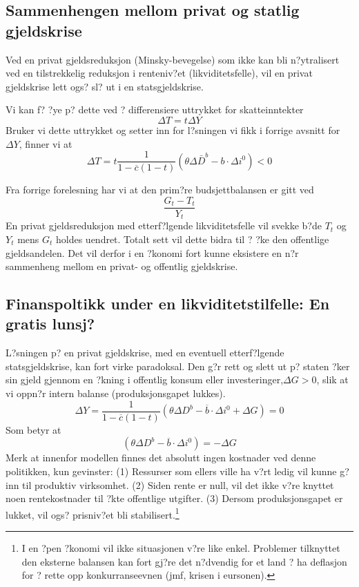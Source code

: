 \documentclass[a4paper,notitlepage]{article}
\begin{document}
\subsection{Sammenhengen mellom privat og statlig gjeldskrise}
Ved en privat gjeldsreduksjon (Minsky-bevegelse) som ikke kan bli n?ytralisert ved en tilstrekkelig reduksjon i renteniv?et (likviditetsfelle), vil en privat gjeldskrise lett ogs? sl? ut i en statsgjeldskrise.

Vi kan f? ?ye p? dette ved ? differensiere uttrykket for skatteinntekter \begin{equation*}
\Delta T=t \Delta Y
\end{equation*}
Bruker vi dette uttrykket og setter inn for l?sningen vi fikk i forrige avsnitt for $\Delta Y$, finner vi at
\begin{equation*}
\Delta T=t \frac{1}{1-\overline{c}(1-t)}(\theta \Delta\bar{D}^{b}-b\cdot \Delta i ^{0})<0
\end{equation*}

Fra forrige forelesning har vi at den prim?re budsjettbalansen er gitt ved \begin{equation*}
\frac{G_{t}-T_{t}}{Y_{t}}
\end{equation*}
En privat gjeldsreduksjon med etterf?lgende likviditetsfelle vil svekke b?de $T_{t}$ og $Y_{t}$ mens $G_{t}$ holdes uendret. Totalt sett vil dette bidra til ? ?ke den offentlige gjeldsandelen.
Det vil derfor i en ?konomi fort kunne eksistere en n?r sammenheng mellom en privat- og offentlig gjeldskrise.
\subsection{Finanspoltikk under en likviditetstilfelle: En gratis lunsj?}
L?sningen p? en privat gjeldskrise, med en eventuell etterf?lgende statsgjeldskrise, kan fort virke paradoksal. Den g?r rett og slett ut p? staten ?ker sin gjeld gjennom en ?kning i offentlig konsum eller investeringer,$\Delta G>0$, slik at vi oppn?r intern balanse (produksjonsgapet lukkes).
\begin{equation*}
\Delta Y=\frac{1}{1-\overline{c}(1-t)}( \theta\Delta D^{b}-\overline{b}\cdot \Delta i ^{0}+\Delta G)=0
\end{equation*}
Som betyr at
\begin{equation*}
(\theta\Delta D^{b}-\overline{b}\cdot \Delta i ^{0})=-\Delta G
\end{equation*}
Merk at innenfor modellen finnes det absolutt ingen kostnader ved denne politikken, kun  gevinster: (1) Ressurser som ellers ville ha v?rt ledig vil kunne g? inn til produktiv virksomhet. (2) Siden rente er null, vil det ikke v?re knyttet noen rentekostnader til ?kte offentlige utgifter. (3) Dersom produksjonsgapet er lukket, vil ogs? prisniv?et bli stabilisert.\footnote{I en ?pen ?konomi vil ikke situasjonen v?re like enkel. Problemer tilknyttet den eksterne balansen kan fort gj?re det n?dvendig for et land ? ha deflasjon for ? rette opp konkurranseevnen (jmf, krisen i eursonen).}
\begin{equation*}
\end{equation*}
%
%
\end{document}
